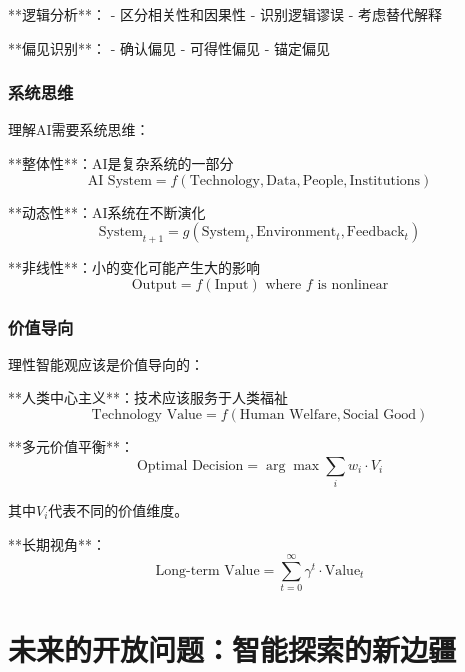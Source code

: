 **逻辑分析**：
- 区分相关性和因果性
- 识别逻辑谬误
- 考虑替代解释

**偏见识别**：
- 确认偏见
- 可得性偏见
- 锚定偏见

\subsubsection{系统思维}

理解AI需要系统思维：

**整体性**：AI是复杂系统的一部分
\begin{equation}
\text{AI System} = f(\text{Technology}, \text{Data}, \text{People}, \text{Institutions})
\end{equation}

**动态性**：AI系统在不断演化
\begin{equation}
\text{System}_{t+1} = g(\text{System}_t, \text{Environment}_t, \text{Feedback}_t)
\end{equation}

**非线性**：小的变化可能产生大的影响
\begin{equation}
\text{Output} = f(\text{Input}) \text{ where } f \text{ is nonlinear}
\end{equation}

\subsubsection{价值导向}

理性智能观应该是价值导向的：

**人类中心主义**：技术应该服务于人类福祉
\begin{equation}
\text{Technology Value} = f(\text{Human Welfare}, \text{Social Good})
\end{equation}

**多元价值平衡**：
\begin{equation}
\text{Optimal Decision} = \arg\max \sum_i w_i \cdot V_i
\end{equation}

其中$V_i$代表不同的价值维度。

**长期视角**：
\begin{equation}
\text{Long-term Value} = \sum_{t=0}^{\infty} \gamma^t \cdot \text{Value}_t
\end{equation}

\section{未来的开放问题：智能探索的新边疆}

